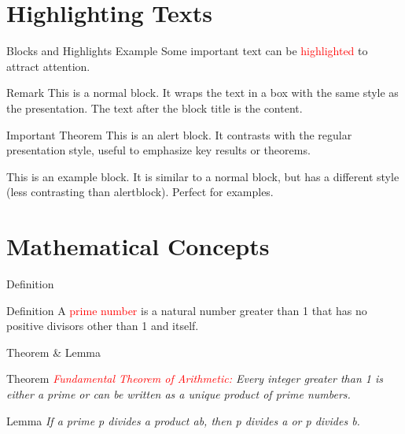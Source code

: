 \documentclass[pdf]{beamer}
\begin{document}
	\section{Highlighting Texts}
	\begin{frame}{Blocks and Highlights Example}
		Some important text can be \textcolor{red}{highlighted} to attract attention.
		\begin{block}{Remark}
			This is a normal block. It wraps the text in a box with the same style as
			the presentation. The text after the block title is the content.
		\end{block}
		\begin{alertblock}{Important Theorem}
			This is an alert block. It contrasts with the regular presentation style,
			useful to emphasize key results or theorems.
		\end{alertblock}
		\begin{example}
			This is an example block. It is similar to a normal block, but has a
			different style (less contrasting than alertblock). Perfect for examples.
		\end{example}
	\end{frame}
	\section{Mathematical Concepts} 
	\begin{frame}{Definition}
		\begin{block}{Definition}
			A \textcolor{red}{prime number} is a natural number greater than 1 that has no positive
			divisors other than 1 and itself.
		\end{block}
	\end{frame}
	\begin{frame}{Theorem \& Lemma}
		\begin{block}{Theorem}
			\emph{\textcolor{red}{Fundamental Theorem of Arithmetic:} Every integer greater than 1 is
			either a prime or can be written as a unique product of prime numbers.}
		\end{block} 
		\begin{block}{Lemma}
			\emph{If a prime p divides a product ab, then p divides a or p divides b.}
		\end{block}
	\end{frame}
\end{document}
